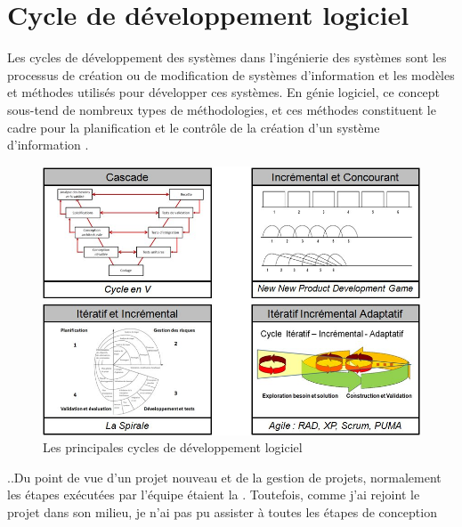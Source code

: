\section{Cycle de développement logiciel}

Les cycles de développement des systèmes dans l'ingénierie des systèmes sont les processus de création ou de modification de systèmes d'information et les modèles et méthodes utilisés pour développer ces systèmes. En génie logiciel, ce concept sous-tend de nombreux types de méthodologies, et ces méthodes constituent le cadre pour la planification et le contrôle de la création d'un système d'information \cite{cycle}.

\begin{figure}[h]
\begin{center}
    \includegraphics[scale=0.4]{img/cycles-basiques}
    \caption{Les principales cycles de développement logiciel}
	\label{cycles-basiques}
\end{center}
\end{figure}

..Du point de vue d'un projet nouveau et de la gestion de projets, normalement les étapes exécutées par l'équipe étaient la . Toutefois, comme j'ai rejoint le projet dans son milieu, je n'ai pas pu assister à toutes les étapes de conception  
